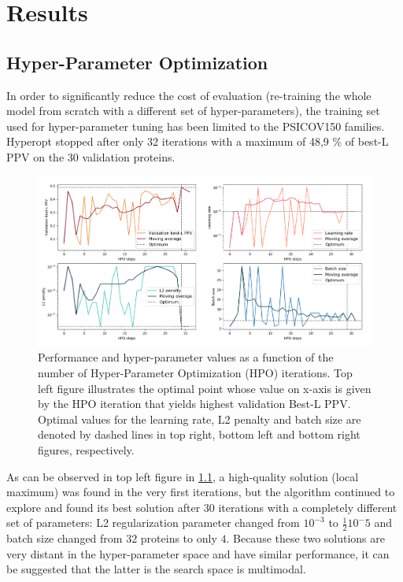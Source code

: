 \chapter{Results}

\section{Hyper-Parameter Optimization}

    In order to significantly reduce the cost of evaluation (re-training
    the whole model from scratch with a different set of hyper-parameters),
    the training set used for hyper-parameter tuning has been
    limited to the PSICOV150 families.
    Hyperopt stopped after only 32 iterations with a maximum of 48,9 \%
    of best-L PPV on the 30 validation proteins.

    \begin{figure}[H]
        \begin{center}
            \includegraphics[width=\textwidth, keepaspectratio]{imgs/hpo.png}
            \caption{Performance and hyper-parameter values as a function of the number
            of Hyper-Parameter Optimization (HPO) iterations.
            Top left figure illustrates the optimal point whose value on x-axis
            is given by the HPO iteration that yields highest validation Best-L PPV.
            Optimal values for the learning rate, L2 penalty and batch size are denoted
            by dashed lines in top right, bottom left and bottom right figures, respectively.}
            \label{hpoparams}
        \end{center}
    \end{figure}

    As can be observed in top left figure in \ref{hpoparams}, a high-quality solution (local maximum)
    was found in the very first iterations, but the algorithm continued to explore and
    found its best solution after 30 iterations with a completely different set of parameters:
    L2 regularization parameter changed from $10^{-3}$ to $\frac{1}{2} 10^-{5}$ and
    batch size changed from $32$ proteins to only $4$. Because these two solutions
    are very distant in the hyper-parameter space and have similar performance,
    it can be suggested that the latter is the search space is multimodal.

